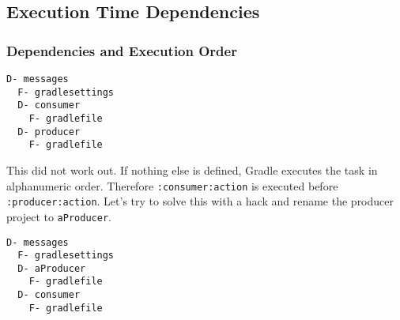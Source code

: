 \subsection{Execution Time Dependencies} %
\label{sub:execution_time_dependencies}

\subsubsection{Dependencies and Execution Order} %
\label{ssub:dependencies_and_execution_order}

\begin{minipage}[t]{7cm}
\begin{Verbatim}[frame=single,label=Project Tree]
D- messages
  F- gradlesettings
  D- consumer
    F- gradlefile
  D- producer
    F- gradlefile	
\end{Verbatim}
\end{minipage}	
\begin{minipage}[t]{9cm}
\end{minipage}

This did not work out. If nothing else is defined, Gradle executes the task in alphanumeric order. Therefore \texttt{:consumer:action} is executed before \texttt{:producer:action}. Let's try to solve this with a hack and rename the producer project to \texttt{aProducer}.

\begin{minipage}[t]{7cm}
\begin{Verbatim}[frame=single,label=Project Tree]
D- messages
  F- gradlesettings
  D- aProducer
    F- gradlefile
  D- consumer
    F- gradlefile	
\end{Verbatim}
\end{minipage}	
\begin{minipage}[t]{9cm}
\end{minipage}

